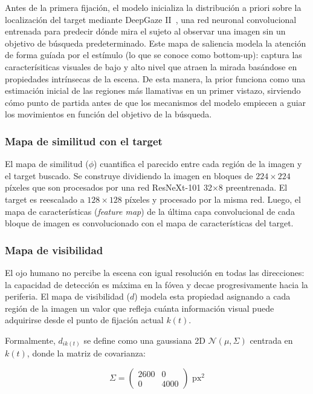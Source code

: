 Antes de la primera fijación, el modelo inicializa la distribución
a priori sobre la localización del target mediante DeepGaze II~\citep{kummerer2021}, una red neuronal convolucional entrenada para predecir dónde mira el sujeto al observar una imagen sin un objetivo de búsqueda predeterminado. Este mapa de saliencia modela la atención de forma guíada por el estímulo (lo que se conoce como bottom-up): captura las caracterísiticas visuales de bajo y alto nivel que atraen la mirada basándose en propiedades intrínsecas de la escena. De esta manera, la prior funciona como una estimación inicial de las regiones más llamativas en un primer vistazo, sirviendo cómo punto de partida antes de que los mecanismos del modelo empiecen a guiar los movimientos en función del objetivo de la búsqueda.

\subsubsection{Mapa de similitud con el target}

El mapa de similitud ($\phi$) cuantifica el parecido entre cada 
región de la imagen y el target buscado. Se construye dividiendo la 
imagen en bloques de $224 \times 224$ píxeles que son procesados por 
una red ResNeXt-101 32$\times$8 preentrenada. El target 
es reescalado a $128 \times 128$ píxeles y procesado por la misma red. 
Luego, el mapa de características (\textit{feature map}) de la última 
capa convolucional de cada bloque de imagen es convolucionado con el 
mapa de características del target. 

\subsubsection{Mapa de visibilidad}

El ojo humano no percibe la escena con igual resolución en 
todas las direcciones: la capacidad de detección es máxima en la fóvea 
y decae progresivamente hacia la periferia. El mapa de visibilidad 
($d$) modela esta propiedad asignando a cada región de la imagen un 
valor que refleja cuánta información visual puede adquirirse desde el 
punto de fijación actual $k(t)$.

Formalmente, $d_{ik(t)}$ se define como una gaussiana 2D 
$\mathcal{N}(\mu, \Sigma)$ centrada en $k(t)$, donde la matriz de 
covarianza:

\begin{equation}
    \Sigma = \begin{pmatrix} 2600 & 0 \\ 0 & 4000 \end{pmatrix} 
    \text{ px}^2
\end{equation}

